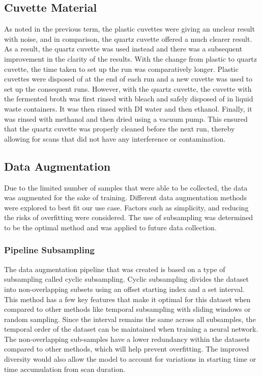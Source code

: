 \documentclass[final, 3p, 11pt]{elsarticle}
\begin{document}
\subsection{Cuvette Material}
As noted in the previous term, the plastic cuvettes were giving an unclear result with noise, and in comparison, the quartz cuvette offered a much clearer result. As a result, the quartz cuvette was used instead and there was a subsequent improvement in the clarity of the results. With the change from plastic to quartz cuvette, the time taken to set up the run was comparatively longer. Plastic cuvettes were disposed of at the end of each run and a new cuvette was used to set up the consequent runs. However, with the quartz cuvette, the cuvette with the fermented broth was first rinsed with bleach and safely disposed of in liquid waste containers. It was then rinsed with DI water and then ethanol. Finally, it was rinsed with methanol and then dried using a vacuum pump. This ensured that the quartz cuvette was properly cleaned before the next run, thereby allowing for scans that did not have any interference or contamination.

\subsection{Data Augmentation}
Due to the limited number of samples that were able to be collected, the data was augmented for the sake of training. Different data augmentation methods were explored to best fit our use case. Factors such as simplicity, and reducing the risks of overfitting were considered. The use of subsampling was determined to be the optimal method and was applied to future data collection.

\subsubsection{Pipeline Subsampling}
The data augmentation pipeline that was created is based on a type of subsampling called cyclic subsampling. Cyclic subsampling divides the dataset into non-overlapping subsets using an offset starting index and a set interval. This method has a few key features that make it optimal for this dataset when compared to other methods like temporal subsampling with sliding windows or random sampling. Since the interval remains the same across all subsamples, the temporal order of the dataset can be maintained when training a neural network. The non-overlapping sub-samples have a lower redundancy within the datasets compared to other methods, which will help prevent overfitting. The improved diversity would also allow the model to account for variations in starting time or time accumulation from scan duration.
\end{document}
